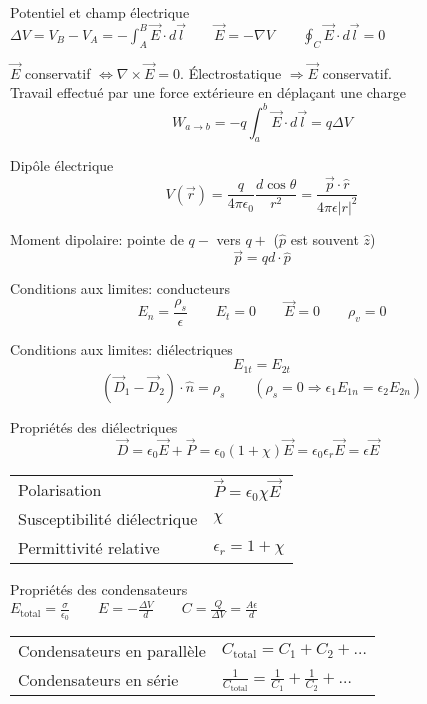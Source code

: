 \documentclass[10pt,landscape]{article}
\newcommand{\extraline}{\vspace{1em}}
\begin{document}
\begin{multicols}{3}
Potentiel et champ électrique
$\Delta V = V_B - V_A  = -\int_A^B \vec{E}\cdot d\vec{l} \qquad \vec{E} = -\nabla V 
 \qquad \oint_C \vec{E}\cdot d\vec{l}  = 0 $

\extraline
$\vec{E}$ conservatif $\Leftrightarrow \nabla \times \vec{E} = 0$.
Électrostatique $\Rightarrow \vec{E}$ conservatif.\\ 

\extraline
Travail effectué par une force extérieure en déplaçant une charge
\[ W_{a\rightarrow b} = -q\int_{a}^{b} \vec{E}\cdot d\vec{l} = q\Delta V \]

Dipôle électrique
\[ V(\vec{r}) = \frac{q}{4\pi\epsilon_0} \frac{d\cos\theta}{r^2} = \frac{\vec{p}\cdot\hat{r}}{4\pi\epsilon|r|^2} \]

Moment dipolaire: pointe de $q-$ vers $q+$ ($\hat{p}$ est souvent $\hat{z}$)
\[ \vec{p} = qd\cdot \hat{p} \]

Conditions aux limites: conducteurs
\[ E_n = \frac{\rho_s}{\epsilon} \qquad E_t = 0 \qquad \vec{E} = 0 \qquad \rho_v = 0 \]

Conditions aux limites: diélectriques
\[ E_{1t} = E_{2t}  \]
\[ (\vec{D}_1 - \vec{D}_2) \cdot \hat{n} = \rho_s  \qquad (\rho_s=0 \Rightarrow \epsilon_1 E_{1n} = \epsilon_2 E_{2n}) \] 

\extraline
Propriétés des diélectriques
\[ \vec{D} = \epsilon_0\vec{E} + \vec{P} = \epsilon_0(1+\chi)\vec{E} = \epsilon_0\epsilon_r\vec{E} = \epsilon\vec{E}
\qquad   \]
\begin{tabular}{@{}ll@{}}
	Polarisation  & $\vec{P} = \epsilon_0\chi\vec{E}$ \\
	Susceptibilité diélectrique  & $\chi$ \\
	Permittivité relative &  $\epsilon_r=1+\chi$
\end{tabular}

\extraline
Propriétés des condensateurs \\
$E_\text{total} = \frac{\sigma}{\epsilon_0} \qquad E = -\frac{\Delta V}{d} 
\qquad C = \frac{Q}{\Delta V} = \frac{A\epsilon}{d}$ \\

\extraline
\begin{tabular}{@{}ll@{}}
	Condensateurs en parallèle  & $C_\text{total} = C_1 + C_2 + \dots$ \\
	Condensateurs en série & $\frac{1}{C_\text{total}} = \frac{1}{C_1} + \frac{1}{C_2} + \dots $
\end{tabular}

\extraline
\hrulefill




\end{multicols}
\end{document}
